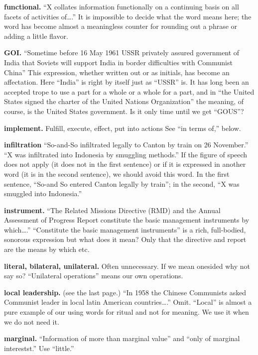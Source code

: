 \documentclass[
    oneside,
    11pt,
    draft
]{memoir}
\begin{document}
\textbf{functional.} \enquote{X collates information functionally on a continuing basis on all facets of activities of\dots.} It is impossible to decide what the word means here; the word has become almost a meaningless counter for rounding out a phrase or adding a little flavor.

\textbf{GOI.} \enquote{Sometime before 16 May 1961 USSR privately assured government of India that Soviets will support India in border difficulties with Communist China} This expression, whether written out or as initials, has become an affectation. Here \enquote{India} is right by itself just as \enquote{USSR} is. It has long been an accepted trope to use a part for a whole or a whole for a part, and in \enquote{the United States signed the charter of the United Nations Organization} the meaning, of course, is the United States government. Is it only time until we get \enquote{GOUS}?

\textbf{implement.} Fulfill, execute, effect, put into actions See \enquote{in terms of,} below.

\textbf{infiltration} \enquote{So-and-So infiltrated legally to Canton by train on 26 November.} \enquote{X was infiltrated into Indonesia by smuggling methods.} If the figure of speech does not apply (it does not in the first sentence) or if it is expressed in another word (it is in the second sentence), we should avoid this word. In the first sentence, \enquote{So-and So entered Canton legally by train}; in the second, \enquote{X was smuggled into Indonesia.}

\textbf{instrument.} \enquote{The Related Missions Directive (RMD) and the Annual Assessment of Progress Report constitute the basic management instruments by which\dots.} \enquote{Constitute the basic management instruments} is a rich, full-bodied, sonorous expression but what does it mean? Only that the directive and report are the means by which etc.

\textbf{literal, bilateral, unilateral.} Often unnecessary. If we mean onesided why not say so? \enquote{Unilateral operations} means our own operations.

\textbf{local leadership.} (see the last page.) \enquote{In 1958 the Chinese Communists asked Communist leader in local latin American countries\dots.} Omit. \enquote{Local} is almost a pure example of our using words for ritual and not for meaning. We use it when we do not need it.

\textbf{marginal.} \enquote{Information of more than marginal value} and \enquote{only of marginal interestst.} Use \enquote{little.}
\end{document}
